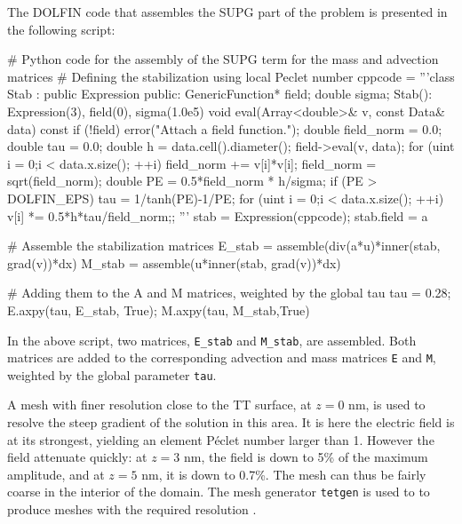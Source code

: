 The DOLFIN code that assembles the SUPG part of the problem is
presented in the following script:
\begin{python}
# Python code for the assembly of the SUPG term for the mass and advection matrices
# Defining the stabilization using local Peclet number
cppcode = '''class Stab : public Expression {
public:
  GenericFunction* field; double sigma;
  Stab(): Expression(3), field(0), sigma(1.0e5){}
  void eval(Array<double>& v, const Data& data) const {
    if (!field)
      error("Attach a field function.");
    double field_norm = 0.0; double tau = 0.0;
    double h = data.cell().diameter();
    field->eval(v, data);
    for (uint i = 0;i < data.x.size(); ++i)
      field_norm += v[i]*v[i];
    field_norm = sqrt(field_norm);
    double PE = 0.5*field_norm * h/sigma;
    if (PE > DOLFIN_EPS)
      tau = 1/tanh(PE)-1/PE;
    for (uint i = 0;i < data.x.size(); ++i)
      v[i] *= 0.5*h*tau/field_norm;}};
'''
stab = Expression(cppcode); stab.field = a

# Assemble the stabilization matrices
E_stab = assemble(div(a*u)*inner(stab, grad(v))*dx)
M_stab = assemble(u*inner(stab, grad(v))*dx)

# Adding them to the A and M matrices, weighted by the global tau
tau = 0.28; E.axpy(tau, E_stab, True); M.axpy(tau, M_stab,True)
\end{python}
In the above script, two matrices, \texttt{E\_stab} and
\texttt{M\_stab}, are assembled. Both matrices are added to the
corresponding advection and mass matrices \texttt{E} and \texttt{M},
weighted by the global parameter \texttt{tau}.

A mesh with finer resolution close to the TT surface, at $z=0$ nm, is
used to resolve the steep gradient of the solution in this area. It is
here the electric field is at its strongest, yielding an element
P\'eclet number larger than 1. However the field attenuate quickly: at
$z=3$ nm, the field is down to 5\% of the maximum amplitude, and at
$z=5$ nm, it is down to 0.7\%. The mesh can thus be fairly coarse in
the interior of the domain. The mesh generator \texttt{tetgen} is used
to to produce meshes with the required resolution \citep{Si2007}.


